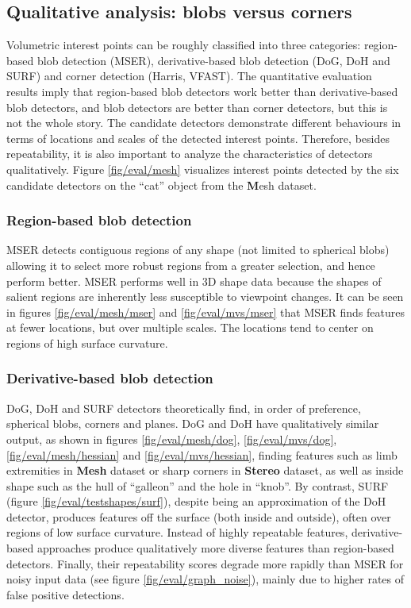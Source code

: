 \subsection{Qualitative analysis: blobs versus corners}
Volumetric interest points can be roughly classified into three categories: region-based blob detection (MSER), derivative-based blob detection (DoG, DoH and SURF) and corner detection (Harris, VFAST). The quantitative evaluation results imply that region-based blob detectors work better than derivative-based blob detectors, and blob detectors are better than corner detectors, but this is not the whole story. The candidate detectors demonstrate different behaviours in terms of locations and scales of the detected interest points. Therefore, besides repeatability, it is also important to analyze the characteristics of detectors qualitatively. Figure \ref{fig/eval/mesh} visualizes interest points detected by the six candidate detectors on the ``cat'' object from the {\textbf Mesh} dataset.

\subsubsection{Region-based blob detection} MSER detects contiguous regions of any shape (\ie not limited to spherical blobs) allowing it to select more robust regions from a greater selection, and hence perform better. MSER performs well in 3D shape data because the shapes of salient regions are inherently less susceptible to viewpoint changes. It can be seen in figures \ref{fig/eval/mesh/mser} and \ref{fig/eval/mvs/mser} that MSER finds features at fewer locations, but over multiple scales. The locations tend to center on regions of high surface curvature.

\subsubsection{Derivative-based blob detection} DoG, DoH and SURF detectors theoretically find, in order of preference, spherical blobs, corners and planes. DoG and DoH have qualitatively similar output, as shown in figures \ref{fig/eval/mesh/dog}, \ref{fig/eval/mvs/dog}, \ref{fig/eval/mesh/hessian} and \ref{fig/eval/mvs/hessian}, finding features such as limb extremities in \textbf{Mesh} dataset or sharp corners in \textbf{Stereo} dataset, as well as inside shape such as the hull of ``galleon'' and the hole in ``knob''. By contrast, SURF (figure \ref{fig/eval/testshapes/surf}), despite being an approximation of the DoH detector, produces features off the surface (both inside and outside), often over regions of low surface curvature. Instead of highly repeatable features, derivative-based approaches produce qualitatively more diverse features than region-based detectors. Finally, their repeatability scores degrade more rapidly than MSER for noisy input data (see figure \ref{fig/eval/graph_noise}), mainly due to higher rates of false positive detections. 


